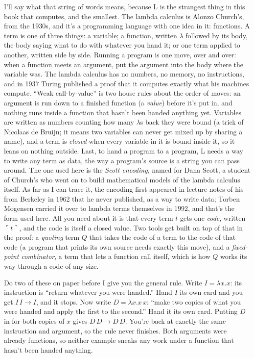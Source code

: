 \documentclass[11pt,twoside]{article}
\theoremstyle{thielethm}
\theoremstyle{thieledef}
\theoremstyle{thieledef}
\theoremstyle{thieledef}
\theoremstyle{thielethm}
\theoremstyle{thieleobs}
\theoremstyle{thielethm}
\begin{document}
I'll say what that string of words means, because L is the strangest thing in this book that
computes, and the smallest. The lambda calculus is Alonzo Church's, from the 1930s, and it's
a programming language with one idea in it: functions. A term is one of three things: a
variable; a function, written $\lambda$ followed by its body, the body saying what to do with
whatever you hand it; or one term applied to another, written side by side. Running a program
is one move, over and over: when a function meets an argument, put the argument into the body
where the variable was. The lambda calculus has no numbers, no memory, no instructions, and in 1937 Turing published a proof that
it computes exactly what his machines compute. ``Weak call-by-value'' is two house rules about
the order of moves: an argument is run down to a finished function (a \emph{value}) before it's
put in, and nothing runs inside a function that hasn't been handed anything yet. Variables
are written as numbers counting how many $\lambda$s back they were bound (a trick of Nicolaas
de Bruijn; it means two variables can never get mixed up by sharing a name), and a term is \emph{closed}
when every variable in it is bound inside it, so it leans on nothing outside. Last, to
hand a program to a program, L needs a way to write any term as data, the way a program's
source is a string you can pass around. The one used here is the \emph{Scott encoding}, named for
Dana Scott, a student of Church's who went on to build mathematical models of the lambda calculus
itself. As far as I can trace it, the encoding first appeared in lecture notes of his from Berkeley
in 1962 that he never published, as a way to write data; Torben Mogensen carried it over to
lambda terms themselves in 1992, and that's the form used here. All you need about it is that every term $t$ gets one \emph{code}, written
$\ulcorner t \urcorner$, and the code is itself a closed value. Two tools get built on top of
that in the proof: a \emph{quoting} term $Q$ that takes the code of a term to the code of that
code (a program that prints its own source needs exactly this move), and a \emph{fixed-point
combinator}, a term that lets a function call itself, which is how $Q$ works its way through
a code of any size.

Do two of these on paper before I give you the general rule. Write
$I=\lambda x.x$: its instruction is ``return whatever you were handed.'' Hand
$I$ its own card and you get $I\,I\to I$, and it stops. Now write
$D=\lambda x.x\,x$: ``make two copies of what you were handed and apply the first
to the second.'' Hand it its own card. Putting $D$ in for both copies of
$x$ gives $D\,D\to D\,D$. You're back at exactly the same instruction and
argument, so the rule never finishes. Both arguments were already
functions, so neither example sneaks any work under a function that hasn't been handed anything.
\end{document}
